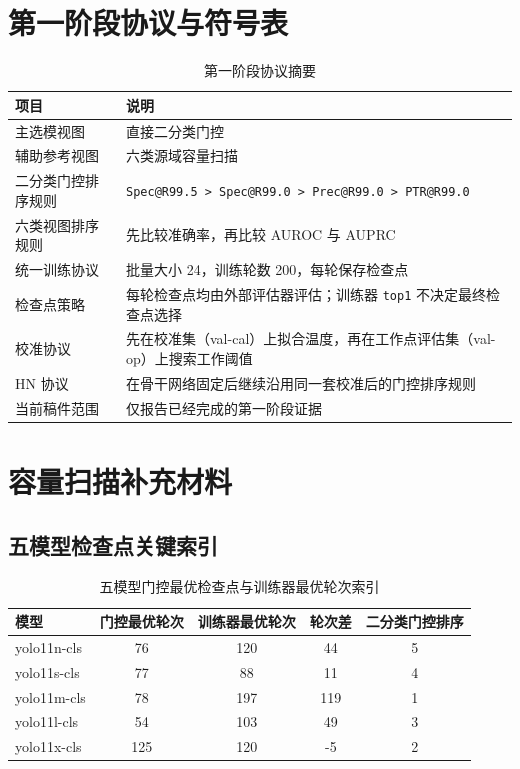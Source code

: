 \documentclass[UTF8,openany,12pt]{ctexbook}
\newcommand{\formalmetric}[1]{\texttt{#1}}
\begin{document}
\chapter{第一阶段协议与符号表}
\begin{table}[H]
    \centering
    \caption{第一阶段协议摘要}
    \label{tab:stage1-capacity-protocol}
    \begin{tabularx}{\textwidth}{>{\raggedright\arraybackslash}p{3.2cm}X}
        \toprule
        项目 & 说明 \\
        \midrule
        主选模视图 & 直接二分类门控 \\
        辅助参考视图 & 六类源域容量扫描 \\
        二分类门控排序规则 & \formalmetric{Spec@R99.5 > Spec@R99.0 > Prec@R99.0 > PTR@R99.0} \\
        六类视图排序规则 & 先比较准确率，再比较 AUROC 与 AUPRC \\
        统一训练协议 & 批量大小 24，训练轮数 200，每轮保存检查点 \\
        检查点策略 & 每轮检查点均由外部评估器评估；训练器 \formalmetric{top1} 不决定最终检查点选择 \\
        校准协议 & 先在校准集（val-cal）上拟合温度，再在工作点评估集（val-op）上搜索工作阈值 \\
        HN 协议 & 在骨干网络固定后继续沿用同一套校准后的门控排序规则 \\
        当前稿件范围 & 仅报告已经完成的第一阶段证据 \\
        \bottomrule
    \end{tabularx}
\end{table}

\chapter{容量扫描补充材料}

\section{五模型检查点关键索引}
\begin{table}[H]
    \centering
    \caption{五模型门控最优检查点与训练器最优轮次索引}
    \label{tab:appendix-capacity-checkpoint-index}
    \begin{tabular}{lcccc}
        \toprule
        模型 & 门控最优轮次 & 训练器最优轮次 & 轮次差 & 二分类门控排序 \\
        \midrule
        yolo11n-cls & 76  & 120 & 44  & 5 \\
        yolo11s-cls & 77  & 88  & 11  & 4 \\
        yolo11m-cls & 78  & 197 & 119 & 1 \\
        yolo11l-cls & 54  & 103 & 49  & 3 \\
        yolo11x-cls & 125 & 120 & -5  & 2 \\
        \bottomrule
    \end{tabular}
\end{table}
\end{document}
